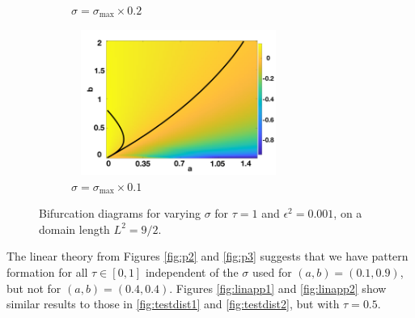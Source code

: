 \begin{figure}[H]
\begin{subfigure}[t]{0.45\textwidth}
        \caption{$\sigma=\sigma_{\max}\times0.2$}
        \label{}
    \end{subfigure}
    \hfill
    \begin{subfigure}[t]{0.45\textwidth}
        \centering
        \includegraphics[width=7cm,height=4.75cm]{t2f4.png}
        \caption{$\sigma=\sigma_{\max}\times0.1$}
        \label{}
    \end{subfigure}
    \caption{Bifurcation diagrams for varying $\sigma$ for $\tau=1$ and $\epsilon^2=0.001$, on a domain length $L^2=9/2$.}
    \label{fig:distmap2}
\end{figure}

The linear theory from Figures \ref{fig:p2} and \ref{fig:p3} suggests that we have pattern formation for all $\tau\in[0,1]$ independent of the $\sigma$ used for $(a,b)=(0.1,0.9)$, but not for $(a,b)=(0.4,0.4)$. Figures \ref{fig:linapp1} and \ref{fig:linapp2} show similar results to those in \ref{fig:testdist1} and \ref{fig:testdist2}, but with $\tau=0.5$.

